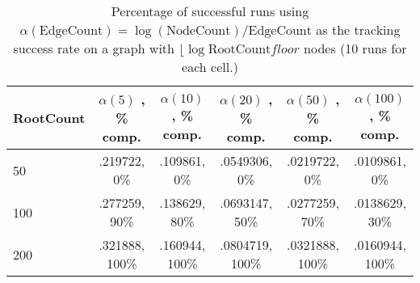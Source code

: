\begin{table}[h]
\centering
\begin{tabular}{l||c|c|c|c|c|}
RootCount&$\alpha (5)$ , \% comp.&$\alpha (10)$ , \% comp.&$\alpha (20)$ , \% comp.&$\alpha (50)$ , \% comp.&$\alpha (100)$ , \% comp.\\
\hline
50&.219722, 0\%&.109861, 0\%&.0549306, 0\%&.0219722, 0\%&.0109861, 0\%\\
100&.277259, 90\%&.138629, 80\%&.0693147, 50\%&.0277259, 70\%&.0138629, 30\%\\
200&.321888, 100\%&.160944, 100\%&.0804719, 100\%&.0321888, 100\%&.0160944, 100\%\\
\end{tabular}
\caption{Percentage of successful runs using $\alpha (\textrm{EdgeCount}) = \log (\textrm{NodeCount})/\textrm{EdgeCount}$ as the tracking success rate on a graph with $\lfloor \log \text{RootCount} 
floor $ nodes (10 runs for each cell.)}
\end{table}